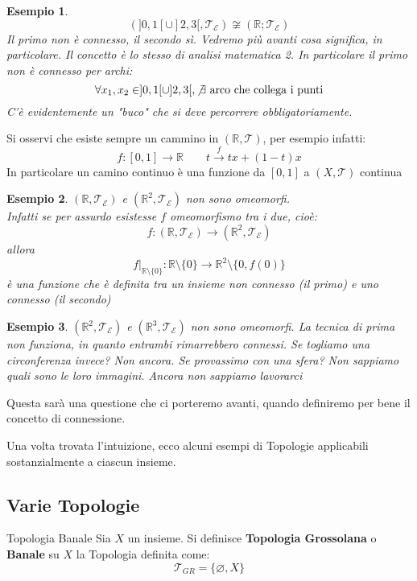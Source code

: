 \documentclass[11pt,a4paper,twoside]{article}
\newtheorem{es}{Esempio}
\theoremstyle{definition}
\begin{document}
\begin{es}
	\[
		(]0,1[\cup ]2,3[, \mathcal T_\mathcal E) \not \cong (\mathbb R; \mathcal T_\mathcal E)
	\]
	Il primo non è connesso, il secondo sì. Vedremo più avanti cosa significa, in particolare. Il concetto è lo stesso di analisi matematica 2. In particolare il primo non è connesso per archi:
	\[
		\forall x_1,x_2 \in ]0,1[\cup]2,3[, \not \exists \text{ arco che collega i punti}
	\]
	C'è evidentemente un "buco" che si deve percorrere obbligatoriamente.
\end{es}

Si osservi che esiste sempre un cammino in $(\mathbb R, \mathcal T)$, per esempio infatti:
\[
	f\colon[0,1] \rightarrow \mathbb R \qquad t \xrightarrow f tx + (1-t)x
\]
In particolare un camino continuo è una funzione da $[0,1]$ a $(X, \mathcal T)$ continua

\begin{es}
	$(\mathbb R, \mathcal T_\mathcal E)$ e $(\mathbb R^2, \mathcal T_ \mathcal E)$ non sono omeomorfi.\\
	Infatti se per assurdo esistesse $f$ omeomorfismo tra i due, cioè:
	\[ f\colon (\mathbb R, \mathcal T_\mathcal E) \rightarrow (\mathbb R^2, \mathcal T_\mathcal E)\]
	allora
	\[ f{\big |}_{\mathbb R\setminus\{0\}}: \mathbb R \setminus \{0\} \rightarrow \mathbb R^2\setminus \{0, f(0)\}\] è una funzione che è definita tra un insieme non connesso (il primo) e uno connesso (il secondo)
\end{es}

\begin{es}
	$(\mathbb R^2, \mathcal T_\mathcal E)$ e $(\mathbb R^3, \mathcal T_\mathcal E)$ non sono omeomorfi. La tecnica di prima non funziona, in quanto entrambi rimarrebbero connessi. Se togliamo una circonferenza invece? Non ancora. Se provassimo con una sfera? Non sappiamo quali sono le loro immagini. Ancora non sappiamo lavorarci
\end{es}

Questa sarà una questione che ci porteremo avanti, quando definiremo per bene il concetto di connessione.

Una volta trovata l'intuizione, ecco alcuni esempi di Topologie applicabili sostanzialmente a ciascun insieme.

\subsection{Varie Topologie}

\begin{defn}{Topologia Banale}{}
	Sia $X$ un insieme. Si definisce \textbf{Topologia Grossolana} o \textbf{Banale} su $X$ la Topologia definita come:
	\[ \mathcal T_{GR} = \{\varnothing, X\}\]
\end{defn}
\end{document}
